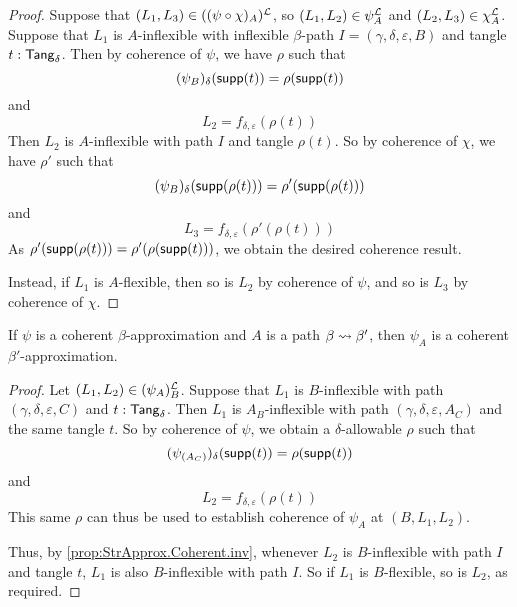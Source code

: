 \begin{proof}
  Suppose that \( (L_1, L_3) \in ((\psi \circ \chi)_A)^{\mathcal L} \), so \( (L_1, L_2) \in \psi_A^{\mathcal L} \) and \( (L_2, L_3) \in \chi_A^{\mathcal L} \).
  Suppose that \( L_1 \) is \( A \)-inflexible with inflexible \( \beta \)-path \( I = (\gamma, \delta, \varepsilon, B) \) and tangle \( t : \mathsf{Tang}_\delta \).
  Then by coherence of \( \psi \), we have \( \rho \) such that
  \[ (\psi_B)_\delta(\operatorname{\mathsf{supp}}(t)) = \rho(\operatorname{\mathsf{supp}}(t)) \]
  and
  \[ L_2 = f_{\delta,\varepsilon}(\rho(t)) \]
  Then \( L_2 \) is \( A \)-inflexible with path \( I \) and tangle \( \rho(t) \).
  So by coherence of \( \chi \), we have \( \rho' \) such that
  \[ (\psi_B)_\delta(\operatorname{\mathsf{supp}}(\rho(t))) = \rho'(\operatorname{\mathsf{supp}}(\rho(t))) \]
  and
  \[ L_3 = f_{\delta,\varepsilon}(\rho'(\rho(t))) \]
  As \( \rho'(\operatorname{\mathsf{supp}}(\rho(t))) = \rho'(\rho(\operatorname{\mathsf{supp}}(t))) \), we obtain the desired coherence result.

  Instead, if \( L_1 \) is \( A \)-flexible, then so is \( L_2 \) by coherence of \( \psi \), and so is \( L_3 \) by coherence of \( \chi \).
\end{proof}
\begin{proposition}
  \label{prop:StrApprox.Coherent.deriv}
  If \( \psi \) is a coherent \( \beta \)-approximation and \( A \) is a path \( \beta \rightsquigarrow \beta' \), then \( \psi_A \) is a coherent \( \beta' \)-approximation.
\end{proposition}
\begin{proof}
  Let \( (L_1, L_2) \in (\psi_A)_B^{\mathcal L} \).
  Suppose that \( L_1 \) is \( B \)-inflexible with path \( (\gamma, \delta, \varepsilon, C) \) and \( t : \mathsf{Tang}_\delta \).
  Then \( L_1 \) is \( A_B \)-inflexible with path \( (\gamma, \delta, \varepsilon, A_C) \) and the same tangle \( t \).
  So by coherence of \( \psi \), we obtain a \( \delta \)-allowable \( \rho \) such that
  \[ (\psi_{(A_C)})_\delta(\operatorname{\mathsf{supp}}(t)) = \rho(\operatorname{\mathsf{supp}}(t)) \]
  and
  \[ L_2 = f_{\delta,\varepsilon}(\rho(t)) \]
  This same \( \rho \) can thus be used to establish coherence of \( \psi_A \) at \( (B, L_1, L_2) \).

  Thus, by \cref{prop:StrApprox.Coherent.inv}, whenever \( L_2 \) is \( B \)-inflexible with path \( I \) and tangle \( t \), \( L_1 \) is also \( B \)-inflexible with path \( I \).
  So if \( L_1 \) is \( B \)-flexible, so is \( L_2 \), as required.
\end{proof}

